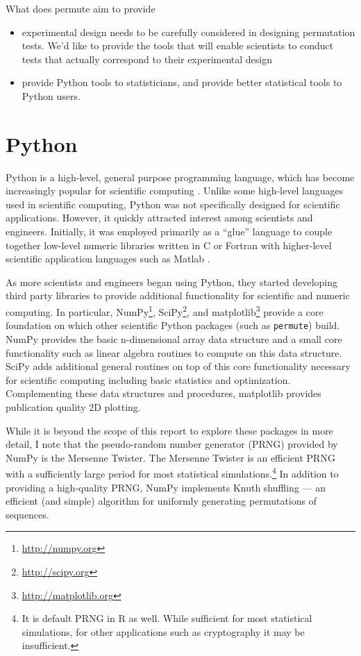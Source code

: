 What does permute aim to provide
\begin{itemize}
\item experimental design needs to be carefully considered in designing
  permutation tests. We'd like to provide the tools that will enable scientists
  to conduct tests that actually correspond to their experimental design
\item provide Python tools to statisticians, and provide better statistical
  tools to Python users.
\end{itemize}

\section{Python}

Python is a high-level, general purpose programming language, which has become
increasingly popular for scientific computing \cite{millman2011python,
Perez2011}. Unlike some high-level languages used in scientific computing,
Python was not specifically designed for scientific applications.  However, it
quickly attracted interest among scientists and engineers.  Initially, it was
employed primarily as a ``glue'' language to couple together low-level numeric
libraries written in C or Fortran with higher-level scientific application
languages such as Matlab \cite{dubois2007guest}.

As more scientists and engineers began using Python, they started developing
third party libraries to provide additional functionality for scientific
and numeric computing.  In particular, NumPy\footnote{\url{http://numpy.org}},
SciPy\footnote{\url{http://scipy.org}}, and matplotlib\footnote{
\url{http://matplotlib.org}} provide a core foundation on which other
scientific Python packages (such as \texttt{permute}) build. NumPy
provides the basic n-dimensional array data structure and a small core
functionality such as linear algebra routines to compute on this
data structure.  SciPy adds additional general routines on top
of this core functionality necessary for scientific computing including
basic statistics and optimization.  Complementing these data structures
and procedures, matplotlib provides publication quality 2D plotting.  

While it is beyond the scope of this report to explore these packages in more
detail, I note that the pseudo-random number generator (PRNG) provided by NumPy
is the Mersenne Twister.  The Mersenne Twister is an efficient PRNG with a
sufficiently large period for most statistical simulations.\footnote{It is
default PRNG in R as well.  While sufficient for most statistical simulations,
for other applications such as cryptography it may be insufficient.}  In
addition to providing a high-quality PRNG, NumPy implements Knuth shuffling ---
an efficient (and simple) algorithm for uniformly generating permutations of
sequences.

